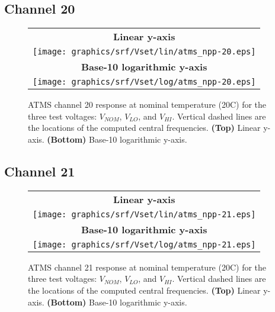 \subsection{Channel 20}
\begin{figure}[H]
  \label{fig:Vset.ch20_response}
  \centering
  \begin{tabular}{c}
    \hspace{0.75cm}\sffamily\textbf{Linear y-axis} \\
    \texttt{[image: graphics/srf/Vset/lin/atms\_npp-20.eps]} \\
    \hspace{0.75cm}\sffamily\textbf{Base-10 logarithmic y-axis} \\
    \texttt{[image: graphics/srf/Vset/log/atms\_npp-20.eps]}
  \end{tabular}
  \caption{ATMS channel 20 response at nominal temperature (20\textdegree{}C) for the three test voltages: $V_{NOM}$, $V_{LO}$, and $V_{HI}$. Vertical dashed lines are the locations of the computed central frequencies. \textbf{(Top)} Linear y-axis. \textbf{(Bottom)} Base-10 logarithmic y-axis.}
\end{figure}

\subsection{Channel 21}
\begin{figure}[H]
  \label{fig:Vset.ch21_response}
  \centering
  \begin{tabular}{c}
    \hspace{0.75cm}\sffamily\textbf{Linear y-axis} \\
    \texttt{[image: graphics/srf/Vset/lin/atms\_npp-21.eps]} \\
    \hspace{0.75cm}\sffamily\textbf{Base-10 logarithmic y-axis} \\
    \texttt{[image: graphics/srf/Vset/log/atms\_npp-21.eps]}
  \end{tabular}
  \caption{ATMS channel 21 response at nominal temperature (20\textdegree{}C) for the three test voltages: $V_{NOM}$, $V_{LO}$, and $V_{HI}$. Vertical dashed lines are the locations of the computed central frequencies. \textbf{(Top)} Linear y-axis. \textbf{(Bottom)} Base-10 logarithmic y-axis.}
\end{figure}

